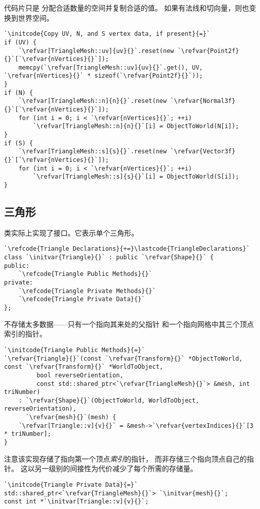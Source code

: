 代码片只是
分配合适数量的空间并复制合适的值。
如果有法线和切向量，则也变换到世界空间。
\begin{lstlisting}
`\initcode{Copy UV, N, and S vertex data, if present}{=}`
if (UV) {
    `\refvar[TriangleMesh::uv]{uv}{}`.reset(new `\refvar{Point2f}{}`[`\refvar{nVertices}{}`]);
    memcpy(`\refvar[TriangleMesh::uv]{uv}{}`.get(), UV, `\refvar{nVertices}{}` * sizeof(`\refvar{Point2f}{}`));
}
if (N) {
    `\refvar[TriangleMesh::n]{n}{}`.reset(new `\refvar{Normal3f}{}`[`\refvar{nVertices}{}`]);
    for (int i = 0; i < `\refvar{nVertices}{}`; ++i)
        `\refvar[TriangleMesh::n]{n}{}`[i] = ObjectToWorld(N[i]);
}
if (S) {
    `\refvar[TriangleMesh::s]{s}{}`.reset(new `\refvar{Vector3f}{}`[`\refvar{nVertices}{}`]);
    for (int i = 0; i < `\refvar{nVertices}{}`; ++i)
        `\refvar[TriangleMesh::s]{s}{}`[i] = ObjectToWorld(S[i]);
}
\end{lstlisting}

\subsection{三角形}\label{sub:三角形}
类实际上实现了接口。它表示单个三角形。
\begin{lstlisting}
`\refcode{Triangle Declarations}{+=}\lastcode{TriangleDeclarations}`
class `\initvar{Triangle}{}` : public `\refvar{Shape}{}` {
public:
    `\refcode{Triangle Public Methods}{}`
private:
    `\refcode{Triangle Private Methods}{}`
    `\refcode{Triangle Private Data}{}`
};
\end{lstlisting}

不存储太多数据——只有一个指向其来处的父指针
和一个指向网格中其三个顶点索引的指针。
\begin{lstlisting}
`\initcode{Triangle Public Methods}{=}`
`\refvar{Triangle}{}`(const `\refvar{Transform}{}` *ObjectToWorld, const `\refvar{Transform}{}` *WorldToObject,
         bool reverseOrientation,
         const std::shared_ptr<`\refvar{TriangleMesh}{}`> &mesh, int triNumber)
    : `\refvar{Shape}{}`(ObjectToWorld, WorldToObject, reverseOrientation),
      `\refvar{mesh}{}`(mesh) {
    `\refvar[Triangle::v]{v}{}` = &mesh->`\refvar{vertexIndices}{}`[3 * triNumber];
}
\end{lstlisting}

注意该实现存储了指向第一个顶点\emph{索引}的指针，
而非存储三个指向顶点自己的指针。
这以另一级别的间接性为代价减少了每个所需的存储量。
\begin{lstlisting}
`\initcode{Triangle Private Data}{=}`
std::shared_ptr<`\refvar{TriangleMesh}{}`> `\initvar{mesh}{}`;
const int *`\initvar[Triangle::v]{v}{}`;
\end{lstlisting}

